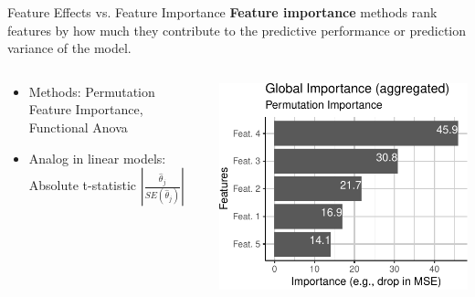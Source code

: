 \documentclass[11pt,compress,t,notes=noshow, xcolor=table]{beamer}
\begin{document}
\begin{vbframe}{Feature Effects vs. Feature Importance}
\textbf{Feature importance} methods rank features by how much they contribute to the predictive performance or prediction variance of the model.
\begin{columns}
\begin{column}{0.6\textwidth}
\begin{itemize}
    \itemsep1em
    \item Methods: Permutation Feature Importance, Functional Anova
    \item Analog in linear models: Absolute t-statistic $\left|\frac{\hat{\theta}_j}{SE(\hat{\theta}_j)}\right|$
\end{itemize}
\end{column}
\begin{column}{0.4\textwidth}
\begin{center}
\includegraphics[page=1, width=\textwidth]{figure/feature-importance}
\end{center}
\end{column}
\end{columns}
\end{vbframe}
\end{document}
